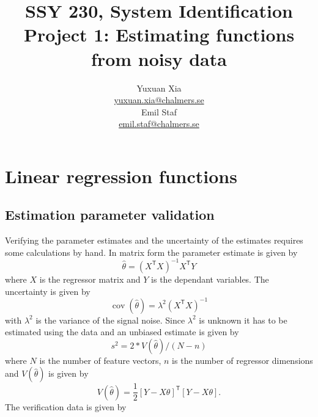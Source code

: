 \documentclass[]{article}
\title{SSY 230, System Identification\\
	Project 1: Estimating functions from noisy data}
\author{Yuxuan Xia\\ \href{mailto:yuxuan.xia@chalmers.se}{yuxuan.xia@chalmers.se}\\Emil Staf\\\href{mailto:emil.staf@chalmers.se}{emil.staf@chalmers.se}}
\DeclareMathOperator{\cov}{cov}
\begin{document}
\maketitle

\section{Linear regression functions}

\subsection{Estimation parameter validation}
Verifying the parameter estimates and the uncertainty of the estimates requires some calculations by hand. In matrix form the parameter estimate is given by
\begin{equation}
	\label{eq:estimate}
	\hat{\theta} = (X^\mathsf{T}X)^{-1}X^\mathsf{T}Y
\end{equation}
where $X$ is the regressor matrix and $Y$ is the dependant variables. The uncertainty is given by
\begin{equation}
	\label{eq:estimate_cov}
	\cov(\hat{\theta}) = \lambda^2(X^\mathsf{T}X)^{-1}
\end{equation}
with $\lambda^2$ is the variance of the signal noise. Since $\lambda^2$ is unknown it has to be estimated using the data and an unbiased estimate is given by
\begin{equation}
	\label{eq:s2}
	s^2 = 2*V(\hat{\theta})/(N-n)
\end{equation}
where $N$ is the number of feature vectors, $n$ is the number of regressor dimensions and $V(\hat{\theta})$ is given by
\begin{equation}
	\label{eq:error}
	V(\hat{\theta}) = \frac{1}{2}[Y-X\theta]^\mathsf{T}[Y-X\theta].
\end{equation}
The verification data is given by 
\end{document}
